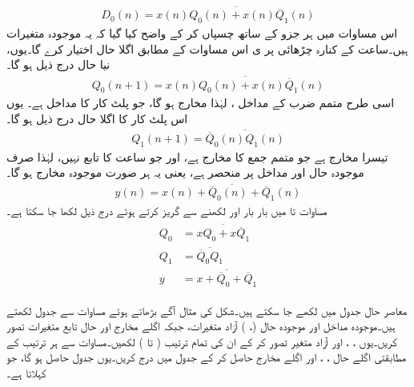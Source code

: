\begin{align*}
D_0(n)=\overline{x(n) Q_0(n) +x(n) \overline{Q}_1(n)} 
\end{align*}
اس مساوات میں ہر جزو کے ساتھ  چسپاں کر کے واضح کیا گیا کہ یہ موجودہ متغیرات ہیں۔ساعت کے کنارہ چڑھائی پر ی  اس مساوات کے مطابق اگلا حال اختیار کرے گا۔یوں، نیا حال  درج ذیل ہو گا۔
\begin{align}\label{مساوات_ترتیبی_مثال_ترتیبی_دور_الف}
Q_0(n+1)=\overline{x(n) Q_0(n) +x(n) \overline{Q}_1(n)} 
\end{align}
اسی طرح متمم ضرب  کے مداخل ،  لہٰذا مخارج  ہو گا، جو پلٹ کار  کا مداخل  ہے۔ یوں اس پلٹ کار کا اگلا حال درج ذیل ہو گا۔
\begin{align}\label{مساوات_ترتیبی_مثال_ترتیبی_دور_ب}
Q_1(n+1)=\overline{\overline{Q}_0(n)Q_1(n)}
\end{align}
تیسرا مخارج  ہے جو متمم جمع  کا مخارج  ہے، اور جو ساعت کا تابع نہیں، لہٰذا  صرف موجودہ حال اور مداخل پر منحصر ہے، یعنی یہ ہر صورت موجودہ مخارج ہو گا۔
\begin{align}\label{مساوات_ترتیبی_مثال_ترتیبی_دور_پ}
y(n)=\overline{x(n)+\overline{Q}_0(n)+\overline{Q}_1(n)}
\end{align}
مساوات  تا  میں بار بار  اور  لکھنے سے گریز کرتے ہوئے درج ذیل لکھا جا سکتا ہے۔
\begin{gather}
\begin{aligned}\label{مساوات_ترتیبی_مثال_ترتیبی_دور_ت}
Q_0&=\overline{x Q_0 +x \overline{Q}_1} \\
Q_1&=\overline{\overline{Q}_0Q_1}\\
y&=\overline{x+\overline{Q}_0+\overline{Q}_1}
\end{aligned}
\end{gather}


معاصر حال جدول میں لکھے جا سکتے ہیں۔شکل  کی مثال آگے بڑھاتے ہوئے مساوات  سے جدول لکھتے ہیں۔موجودہ مداخل  اور موجودہ حال (، ) آزاد متغیرات، جبکہ اگلے مخارج اور حال تابع متغیرات تصور کریں۔یوں  ،  ، اور  آزاد متغیر تصور کر کے ان کی تمام ترتیب ( تا ) لکھیں۔مساوات  سے ہر ترتیب کے مطابقتی اگلے حال ، ، اور اگلے مخارج  حاصل کر کے جدول میں درج کریں۔یوں جدول  حاصل ہو گا، جو  کہلاتا ہے۔

